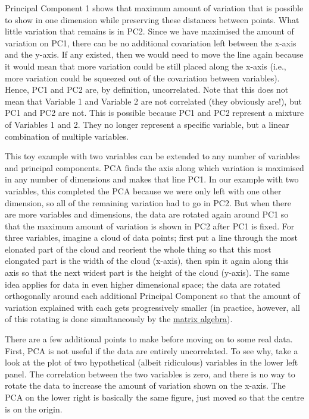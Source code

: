 \documentclass[]{article}
\begin{document}
Principal Component 1 shows that maximum amount of variation that is
possible to show in one dimension while preserving these distances
between points. What little variation that remains is in PC2. Since we
have maximised the amount of variation on PC1, there can be no
additional covariation left between the x-axis and the y-axis. If any
existed, then we would need to move the line again because it would mean
that more variation could be still placed along the x-axis (i.e., more
variation could be squeezed out of the covariation between variables).
Hence, PC1 and PC2 are, by definition, uncorrelated. Note that this does
not mean that Variable 1 and Variable 2 are not correlated (they
obviously are!), but PC1 and PC2 are not. This is possible because PC1
and PC2 represent a mixture of Variables 1 and 2. They no longer
represent a specific variable, but a linear combination of multiple
variables.

This toy example with two variables can be extended to any number of
variables and principal components. PCA finds the axis along which
variation is maximised in any number of dimensions and makes that line
PC1. In our example with two variables, this completed the PCA because
we were only left with one other dimension, so all of the remaining
variation had to go in PC2. But when there are more variables and
dimensions, the data are rotated again around PC1 so that the maximum
amount of variation is shown in PC2 after PC1 is fixed. For three
variables, imagine a cloud of data points; first put a line through the
most elonated part of the cloud and reorient the whole thing so that
this most elongated part is the width of the cloud (x-axis), then spin
it again along this axis so that the next widest part is the height of
the cloud (y-axis). The same idea applies for data in even higher
dimensional space; the data are rotated orthogonally around each
additional Principal Component so that the amount of variation explained
with each gets progressively smaller (in practice, however, all of this
rotating is done simultaneously by the \protect\hyperlink{maths}{matrix
algebra}).

There are a few additional points to make before moving on to some real
data. First, PCA is not useful if the data are entirely uncorrelated. To
see why, take a look at the plot of two hypothetical (albeit ridiculous)
variables in the lower left panel. The correlation between the two
variables is zero, and there is no way to rotate the data to increase
the amount of variation shown on the x-axis. The PCA on the lower right
is basically the same figure, just moved so that the centre is on the
origin.
\end{document}
